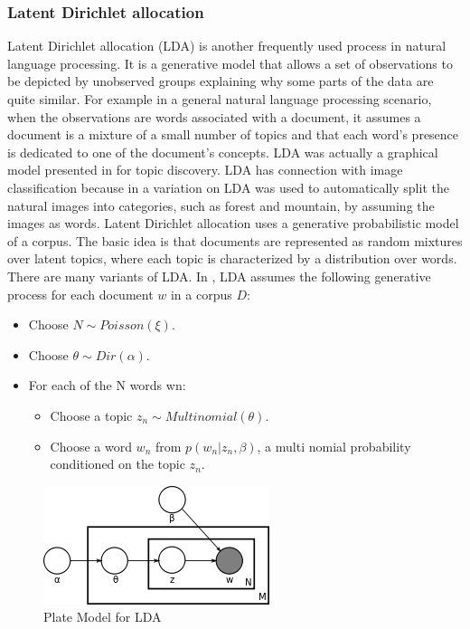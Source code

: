 \subsubsection{Latent Dirichlet allocation}
Latent Dirichlet allocation (LDA) is another frequently used 
process in natural language processing. It is a generative model 
that allows a set of observations to be depicted by unobserved groups 
explaining why some parts of the data are quite similar. For example 
in a general natural language processing scenario, when the 
observations are words associated with a document, it 
assumes a document is a mixture of a small number of topics and that 
each word's presence is dedicated to one of the document's concepts. 
LDA was actually a graphical model presented in \citet*{Blei} for 
topic discovery.  LDA has connection with image classification 
because in \citet*{Li} a variation on LDA was used to automatically 
split the natural images into categories, such as  forest and 
mountain, by assuming the images as words. 
Latent Dirichlet allocation uses a generative probabilistic 
model of a corpus. The basic idea is that documents are represented 
as random mixtures over latent topics, where each topic is 
characterized by a distribution over words. There are many variants 
of LDA. In \citet*{Blei}, LDA assumes the following generative process 
for each document $w$ in a corpus $D$:
	\begin{itemize}
	\item Choose $N \sim Poisson(\xi)$.
	\item Choose $\theta \sim Dir(\alpha)$.
	\item For each of the N words wn:
	\begin{itemize}
		\item  Choose a topic $z_n \sim Multinomial(\theta).$
		\item Choose a word $w_n$ from $p(w_n | z_n,\beta)$, a multi nomial probability conditioned on the topic $z_n$.
	\end{itemize}
	\end{itemize}
 \begin{center}
\begin{figure}
\centering
\includegraphics[width=\linewidth]{./Pictures/Latent_Dirichlet_allocation.png}
\caption{Plate Model for  LDA  \citet*{Blei}}
\label{fig:ldaExample}
\end{figure}
\end{center}
